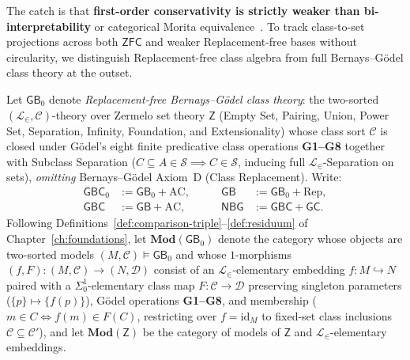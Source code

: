 The catch is that \textbf{first-order conservativity is strictly weaker than bi-interpretability} or categorical Morita equivalence~\cite{Caramello18}. To track class-to-set projections across both $\mathsf{ZFC}$ and weaker Replacement-free bases without circularity, we distinguish Replacement-free class algebra from full Bernays--G\"odel class theory at the outset.

\begin{definition}\label{def:set-projection-fibration}%
%
\leanwitness%
%
Let $\mathsf{GB}_0$ denote \emph{Replacement-free Bernays--G\"odel class theory}: the two-sorted $(\mathcal{L}_\in, \mathcal{C})$-theory over Zermelo set theory $\mathsf{Z}$ (Empty Set, Pairing, Union, Power Set, Separation, Infinity, Foundation, and Extensionality) whose class sort $\mathcal{C}$ is closed under G\"odel's eight finite predicative class operations \textbf{G1--G8} together with Subclass Separation ($C \subseteq A \in \mathcal{S} \implies C \in \mathcal{S}$, inducing full $\mathcal{L}_\in$-Separation on sets), \emph{omitting} Bernays--G\"odel Axiom~D (Class Replacement). Write:
\[
  \begin{aligned}
    \mathsf{GBC}_0 &:= \mathsf{GB}_0 + \mathrm{AC}, &\qquad
    \mathsf{GB} &:= \mathsf{GB}_0 + \mathrm{Rep}, \\
    \mathsf{GBC} &:= \mathsf{GB} + \mathrm{AC}, &\qquad
    \mathsf{NBG} &:= \mathsf{GBC} + \mathsf{GC}.
  \end{aligned}
\]
Following Definitions~\ref{def:comparison-triple}--\ref{def:residuum} of Chapter~\ref{ch:foundations}, let $\mathbf{Mod}(\mathsf{GB}_0)$ denote the category whose objects are two-sorted models $(M, \mathcal{C}) \models \mathsf{GB}_0$ and whose $1$-morphisms $(f, F) : (M, \mathcal{C}) \to (N, \mathcal{D})$ consist of an $\mathcal{L}_\in$-elementary embedding $f : M \hookrightarrow N$ paired with a $\Sigma^1_0$-elementary class map $F : \mathcal{C} \to \mathcal{D}$ preserving singleton parameters ($\{p\} \mapsto \{f(p)\}$), G\"odel operations \textbf{G1--G8}, and membership ($m \in C \iff f(m) \in F(C)$, restricting over $f = \mathrm{id}_M$ to fixed-set class inclusions $\mathcal{C} \subseteq \mathcal{C}'$), and let $\mathbf{Mod}(\mathsf{Z})$ be the category of models of $\mathsf{Z}$ and $\mathcal{L}_\in$-elementary embeddings.

\end{definition}
